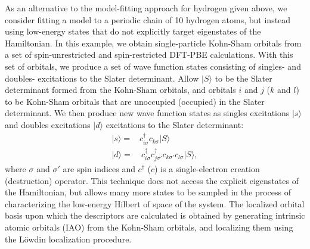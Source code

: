 As an alternative to the model-fitting approach for hydrogen given above, we consider fitting a model to a periodic chain of 10 hydrogen atoms, but instead using low-energy states that do not explicitly target eigenstates of the Hamiltonian. In this example, we obtain single-particle Kohn-Sham orbitals from a set of spin-unrestricted and spin-restricted DFT-PBE calculations. With this set of orbitals, we produce a set of wave function states consisting of singles- and doubles- excitations to the Slater determinant. Allow $| S \rangle $ to be the Slater determinant formed from the Kohn-Sham orbitals, and orbitals $i$ and $j$ ($k$ and $l$) to be Kohn-Sham orbitals that are unoccupied (occupied) in the Slater determinant. We then produce new wave function states as singles excitations $|s \rangle$ and doubles excitations $| d \rangle$ excitations to the Slater determinant:
\begin{subequations}
\begin{eqnarray}
| s \rangle = & c^\dagger_{i \sigma} c_{k \sigma}   | S \rangle \\
| d \rangle = & \: c^\dagger_{i \sigma} c^\dagger_{j \sigma'} c_{k \sigma'} c_{l \sigma}   | S \rangle ,
\end{eqnarray}
\end{subequations}
where $\sigma$ and $\sigma'$ are spin indices and $c^\dagger$ ($c$) is a single-electron creation (destruction) operator. This technique does not access the explicit eigenstates of the Hamiltonian, but allows many more states to be sampled in the process of characterizing the low-energy Hilbert of space of the system. The localized orbital basis upon which the descriptors are calculated is obtained by generating intrinsic atomic orbitals (IAO) from the Kohn-Sham orbitals, and localizing them using the L\"owdin localization procedure.

